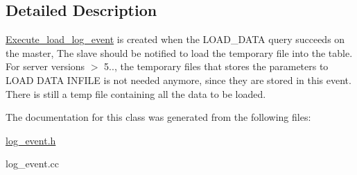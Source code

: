 \subsection{Detailed Description}
\mbox{\hyperlink{classExecute__load__log__event}{Execute\+\_\+load\+\_\+log\+\_\+event}} is created when the L\+O\+A\+D\+\_\+\+D\+A\+TA query succeeds on the master, The slave should be notified to load the temporary file into the table. For server versions $>$ 5.., the temporary files that stores the parameters to L\+O\+AD D\+A\+TA I\+N\+F\+I\+LE is not needed anymore, since they are stored in this event. There is still a temp file containing all the data to be loaded. 

The documentation for this class was generated from the following files\+:\begin{DoxyCompactItemize}
\item 
\mbox{\hyperlink{log__event_8h}{log\+\_\+event.\+h}}\item 
log\+\_\+event.\+cc\end{DoxyCompactItemize}
